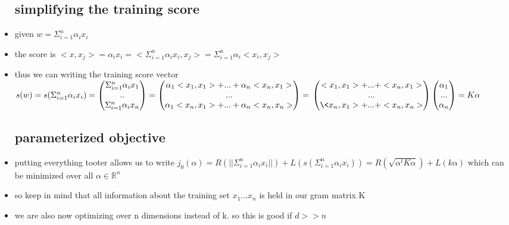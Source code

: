 \documentclass{article}
\begin{document}
\begin{itemize}
\subsection{simplifying the training score }
\item given $w=\Sigma_{i=1}^{n}\alpha_{i}x_{i}$
\item the score is $<x,x_{j}>=\alpha_{i}x_{i}=<\Sigma_{i=1}^{n}\alpha_{i}x_{i},x_j>=\Sigma_{i=1}^{n}\alpha_{i}<x_{i}, x_j>$
\item thus we can writing the training  score vector $s(w)=s(\Sigma_{i=1}^{n}\alpha_{i}x_{i})=\begin{pmatrix}
    \Sigma_{i=1}^{n}\alpha_{i}x_{1}\\..\\\Sigma_{i=1}^{n}\alpha_{i}x_{n}
\end{pmatrix}=\begin{pmatrix}
    \alpha_1<x_1,x_1>+...+\alpha_n<x_n,x_1>\\...\\\alpha_1<x_n,x_1>+...+\alpha_n<x_n,x_n>
\end{pmatrix}=\\\begin{pmatrix}
    <x_1,x_1>+...+<x_n,x_1>\\...\\\<x_n,x_1>+...+<x_n,x_n>
\end{pmatrix}\begin{pmatrix}
    \alpha_1\\...\\\alpha_n
\end{pmatrix}=K\alpha$
\subsection{parameterized objective }
\item putting everything tooter allows us to write $j_{0}(\alpha)=R(||\Sigma_{i=1}^{n}\alpha_ix_i||)+L(s(\Sigma_{i=1}^{n}\alpha_ix_i))=R(\sqrt{\alpha^{t}K\alpha})+L(k\alpha)$ which can be minimized over all $\alpha\in\mathbb{R}^{n}$
\item so keep in mind that all information about the training set $x_1...x_n$ is held in our gram matrix K
\item we are also now optimizing over n dimensions instead of k. so this is good if $d>>n$

\end{itemize}
\end{document}
